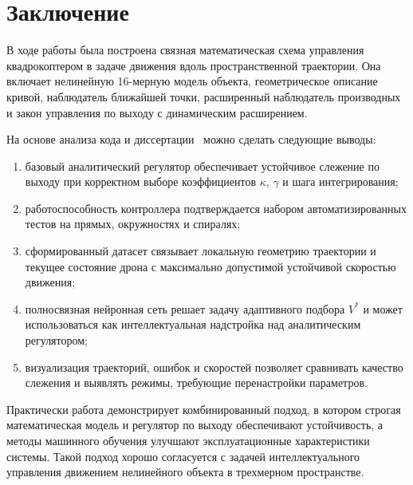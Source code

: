 \section{Заключение}

В ходе работы была построена связная математическая схема управления квадрокоптером в задаче движения вдоль пространственной траектории.
Она включает нелинейную 16-мерную модель объекта, геометрическое описание кривой, наблюдатель ближайшей точки, расширенный наблюдатель производных и закон управления по выходу с динамическим расширением.

На основе анализа кода и диссертации~\cite{kim_algorithms} можно сделать следующие выводы:
\begin{enumerate}
    \item базовый аналитический регулятор обеспечивает устойчивое слежение по выходу при корректном выборе коэффициентов $\kappa$, $\gamma$ и шага интегрирования;
    \item работоспособность контроллера подтверждается набором автоматизированных тестов на прямых, окружностях и спиралях;
    \item сформированный датасет связывает локальную геометрию траектории и текущее состояние дрона с максимально допустимой устойчивой скоростью движения;
    \item полносвязная нейронная сеть решает задачу адаптивного подбора $V^{\ast}$ и может использоваться как интеллектуальная надстройка над аналитическим регулятором;
    \item визуализация траекторий, ошибок и скоростей позволяет сравнивать качество слежения и выявлять режимы, требующие перенастройки параметров.
\end{enumerate}\hfill\break
Практически работа демонстрирует комбинированный подход, в котором строгая математическая модель и регулятор по выходу обеспечивают устойчивость, а методы машинного обучения улучшают эксплуатационные характеристики системы.
Такой подход хорошо согласуется с задачей интеллектуального управления движением нелинейного объекта в трехмерном пространстве.